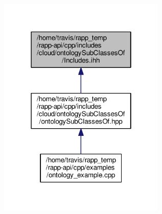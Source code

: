 \begin{figure}[H]
\begin{center}
\leavevmode
\includegraphics[width=226pt]{cloud_2ontologySubClassesOf_2Includes_8ihh__dep__incl}
\end{center}
\end{figure}
